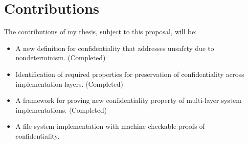 \section{Contributions}

The contributions of my thesis, subject to this proposal, will be:

\begin{itemize}
 \item A new definition for confidentiality that addresses unsafety due to nondeterminism. (Completed)
 \item Identification of required properties for preservation of confidentiality across implementation layers. (Completed)
 \item A framework for proving new confidentiality property of multi-layer system implementations. (Completed)
 \item A file system implementation with machine checkable proofs of confidentiality.
\end{itemize}